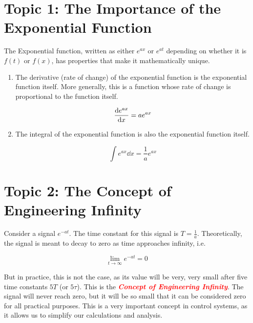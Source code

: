 \documentclass[
  12pt,
  a4paper,
]{report}
\begin{document}
\newpage{}

\label{topic1}
\section{Topic 1: The Importance of the Exponential
Function}\label{topic-1-the-importance-of-the-exponential-function}

The Exponential function, written as either \(e^{ax}\) or \(e^{at}\)
depending on whether it is \(f(t)\) or \(f(x)\), has properties that
make it mathematically unique.

\begin{enumerate}
\def\labelenumi{\arabic{enumi}.}
\item
  The derivative (rate of change) of the exponential function is the
  exponential function itself. More generally, this is a function whose
  rate of change is proportional to the function itself.

  \label{exp-derivative}
  \begin{equation} 
  \label{eq:exp-derivative}     
  \dv{e^{ax}}{x} = a e^{ax} 
  \end{equation}
\item
  The integral of the exponential function is also the exponential
  function itself.

  \label{exp-integral}
  \begin{equation} 
  \label{eq:exp-integral}     
  \int e^{ax} \dd{x} = \frac{1}{a} e^{ax} \end{equation}
\end{enumerate}

\label{topic2}
\section{Topic 2: The Concept of Engineering
Infinity}\label{topic-2-the-concept-of-engineering-infinity}

Consider a signal \(e^{-at}\). The time constant for this signal is
\(T = \frac{1}{a}\). Theoretically, the signal is meant to decay to zero
as time approaches infinity, i.e.

\label{engineering-infinity}
\begin{equation} 
\label{eq:eng-infinity}     
\lim_{t \to \infty} e^{-at} = 0  \end{equation}

But in practice, this is not the case, as its value will be very, very
small after five time constants \(5T\) (or \(5\tau\)). This is the
\textcolor{red}{\textbf{\textit{Concept of Engineering Infinity}}}. The
signal will never reach zero, but it will be so small that it can be
considered zero for all practical purposes. This is a very important
concept in control systems, as it allows us to simplify our calculations
and analysis.
\end{document}
